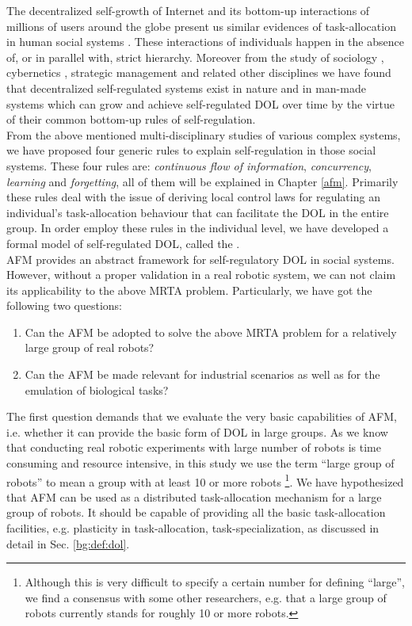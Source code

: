 The decentralized self-growth of Internet and its bottom-up interactions of millions of users around the globe present us similar evidences of task-allocation in human social systems \cite{Andriani+2004}. These interactions of individuals happen in the absence of, or in parallel with, strict hierarchy. Moreover from the study of sociology , cybernetics  , strategic management   and related other disciplines we have found that decentralized self-regulated systems exist in nature and in man-made systems which can grow and achieve self-regulated DOL over time by the virtue of their common bottom-up rules of self-regulation.\\
From the above mentioned multi-disciplinary studies of various complex systems, we have proposed four generic rules to explain self-regulation in those social systems. These four rules are: \textit{continuous flow of information}, \textit{concurrency}, \textit{learning} and \textit{forgetting}, all of them will be explained in Chapter \ref{afm}. Primarily these rules  deal with the issue of deriving local control laws for regulating an individual's task-allocation behaviour that can facilitate the DOL in the entire group. In order employ these rules in the individual level, we have developed a formal model of self-regulated DOL, called the .\\
AFM provides an abstract framework for self-regulatory DOL in social systems. However, without a proper validation in a real robotic system, we can not claim its applicability to the above MRTA problem. Particularly, we have got the following two questions:
\begin{enumerate}
\item Can the AFM  be adopted to solve the above MRTA problem for a relatively large group of real robots?
\item Can the AFM be made relevant for industrial scenarios as well as for the emulation of biological tasks?
\end{enumerate}
The first question demands that we evaluate the very basic capabilities of AFM, i.e. whether it can provide the basic form of DOL in large groups. As we know that conducting real robotic experiments with large number of robots is time consuming and resource intensive, in this study we use the term ``large group of robots'' to mean a group with at least 10 or more robots \footnote{Although this is very difficult to specify a certain number for defining ``large'', we find a consensus with some other researchers, e.g. \protect{} that a large group of robots currently  stands for roughly 10 or more robots.}. We have hypothesized that AFM can be used as a distributed task-allocation mechanism for a large group of robots. It should be capable of providing all the basic task-allocation facilities, e.g. plasticity in task-allocation, task-specialization, as discussed in detail in Sec. \ref{bg:def:dol}.\\
